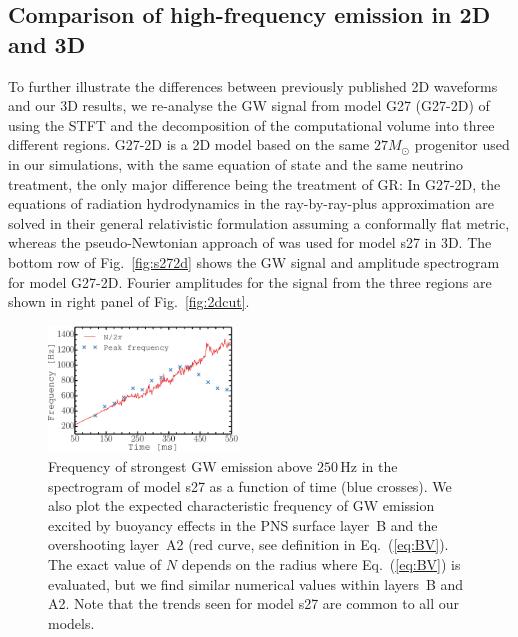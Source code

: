 \subsection{Comparison of high-frequency emission in 2D and 3D}
To further illustrate the differences between previously published 2D waveforms and our 3D results, we
re-analyse the GW signal from model G27 (G27-2D) of \citet{mueller_13} using
the STFT and the decomposition of the computational volume into three
different regions. G27-2D is a 2D model based on the same $27 M_\odot$
progenitor used in our simulations, with the same equation of state
and the same neutrino treatment, the only major difference being the
treatment of GR: In G27-2D, the equations of radiation hydrodynamics in
the ray-by-ray-plus approximation are solved in their general
relativistic formulation assuming a conformally flat metric, whereas
the pseudo-Newtonian approach of \citet{marek_06} was used for model s27
in 3D. The bottom row of Fig.~\ref{fig:s272d} shows the GW signal and amplitude spectrogram for model G27-2D.
Fourier amplitudes for the signal from the three regions are shown in right panel of Fig.~\ref{fig:2dcut}.
\begin{figure}
\includegraphics[width=0.45\textwidth]{./images/chp1/fig7.pdf}
\caption{Frequency of strongest GW emission
above $250 \, \mathrm{Hz}$ in the spectrogram of model s27 as a function of time (blue crosses).
We also plot the expected characteristic frequency of GW emission excited by buoyancy effects
in the PNS surface layer~B and the overshooting layer~A2 (red curve, see definition in Eq.~(\ref{eq:BV}).
The exact value of $N$ depends on the radius where Eq.~(\ref{eq:BV}) is evaluated, 
but we find similar numerical values within layers~B and A2. Note that the trends seen for model s27 are common to all our models.
\label{fig:fpeak}}
\end{figure}

